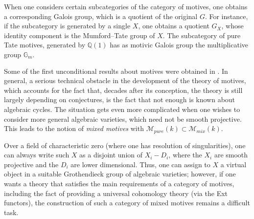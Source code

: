 \documentclass[10pt]{amsart}
\newcommand{\bG}{\mathbb{G}}
\def\Q{{\mathbb Q}}
\def\M{{\mathcal M}}
\numberwithin{equation}{section}
\begin{document}
When one considers certain subcategories of the category of motives,
one obtains a corresponding Galois group, which is a quotient of
the original $G$. For instance, if the subcategory is generated by
a single $X$, one obtains a quotient $G_X$,
whose identity component is the Mumford--Tate group of $X$.
The subcategory of pure Tate motives, generated by
$\Q(1)$ has as motivic Galois group the multiplicative group $\bG_m$.

\smallskip

Some of the first unconditional results about motives were obtained in
\cite{Man2}. In general, a serious technical obstacle in the
development of the theory of motives, which accounts for the fact
that, decades after its conception, the theory is still largely
depending on conjectures, is
the fact that not enough is known about algebraic cycles.
The situation gets even more complicated when one wishes to consider more
general algebraic varieties, which need not be smooth projective. This
leads to the notion of {\em mixed motives} with $\M_{pure}(k)\subset
\M_{mix}(k)$.

\smallskip

Over a field of characteristic zero (where one has resolution of
singularities), one can always write such $X$ as a disjoint union
of $X_i - D_i$, where the $X_i$ are smooth projective and the
$D_i$ are lower dimensional. Thus, one can assign to $X$ a virtual
object in a suitable Grothendieck group of algebraic varieties;
however, if one wants a theory that satisfies the main
requirements of a category of motives, including the fact of
providing a universal cohomology theory (via the Ext functors),
the construction of such a category of mixed motives remains a
difficult task.

\smallskip
\end{document}

